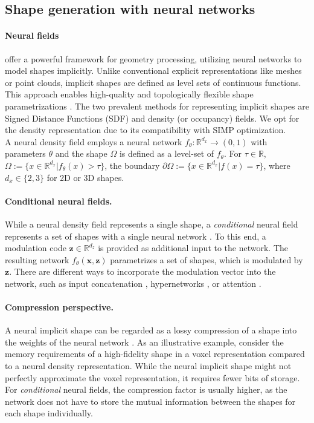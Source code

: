\subsection{Shape generation with neural networks}


\paragraph{Neural fields} offer a powerful framework for geometry processing, utilizing neural networks to model shapes implicitly.
Unlike conventional explicit representations like meshes or point clouds, implicit shapes are defined as level sets of continuous functions.
This approach enables high-quality and topologically flexible shape parametrizations \citep{chen2019implicit}. The two prevalent methods for representing implicit shapes are Signed Distance Functions (SDF) \citep{park2019deepsdf, Atzmon2020sal} and density (or occupancy) \citep{mescheder2019occupancy} fields. We opt for the density representation due to its compatibility with SIMP optimization.
\\
A neural density field employs a neural network $f_\theta: \mathbb{R}^{d_x} \to (0, 1)$ with parameters $\theta$ and the shape $\Omega$ is defined as a level-set of $f_{\theta}$. For $\tau \in \mathbb{R}$, $\Omega := \{x \in \mathbb{R}^{d_x} | f_\theta(x) > \tau\}$, the boundary $\partial\Omega := \{x \in \mathbb{R}^{d_x} | f(x) = \tau \}$, where $d_x \in \{2, 3\}$ for 2D or 3D shapes.

\paragraph{Conditional neural fields.}
While a neural density field represents a single shape, a \emph{conditional} neural field represents a set of shapes with a single neural network \citep{Mehta21modulation}.
To this end, a modulation code $\mathbf{z} \in \mathbb{R}^{d_z}$ is provided as additional input to the network.
The resulting network $f_\theta(\mathbf{x}, \mathbf{z})$ parametrizes a set of shapes, which is modulated by $\mathbf{z}$.
There are different ways to incorporate the modulation vector into the network, such as input concatenation \citep{park2019deepsdf}, hypernetworks \citep{Ha17hypernetworks}, or attention \citep{Rebain2022Attention}.

\paragraph{Compression perspective.}
A neural implicit shape can be regarded as a lossy compression of a shape into the weights of the neural network \citep{Xie2022nfs}.
As an illustrative example, consider the memory requirements of a high-fidelity shape in a voxel representation compared to a neural density representation.
While the neural implicit shape might not perfectly approximate the voxel representation, it requires fewer bits of storage.
For \emph{conditional} neural fields, the compression factor is usually higher, as the network does not have to store the mutual information between the shapes for each shape individually.





